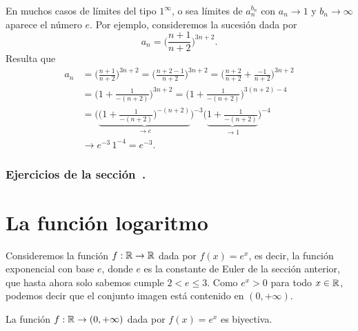 En muchos casos de límites del tipo $1^\infty$, o sea límites de $a_n^{b_n}$ con $a_n \to 1$ y $b_n \to \infty$ aparece el número $e$.
Por ejemplo, consideremos la sucesión dada por 
\[
a_n = \Big(\frac{n+1}{n+2}\Big)^{3n+2}.
\]
Resulta que
\begin{align*}
    a_n &= \Big(\frac{n+1}{n+2}\Big)^{3n+2}
    = \Big(\frac{n+2-1}{n+2}\Big)^{3n+2}
    = \Big(\frac{n+2}{n+2}+\frac{-1}{n+2}\Big)^{3n+2}
    \\
    &= \Big(1+\frac{1}{-(n+2)}\Big)^{3n+2}
    = \Big(1+\frac{1}{-(n+2)}\Big)^{3(n+2)-4}
    \\
    &= \Bigg(\underbrace{\Big(1+\frac{1}{-(n+2)}\Big)^{-(n+2)}}_{\to e}\Bigg)^{-3}
     \Big(\underbrace{1+\frac{1}{-(n+2)}}_{\to 1}\Big)^{-4}
     \\
     &\to e^{-3} \, 1^{-4} = e^{-3}.
\end{align*}

\subsubsection*{Ejercicios de la sección~.}

\begin{enumerate}

\end{enumerate}

\section{La función logaritmo}

Consideremos la función $f:\mathbb{R}\to\mathbb{R}$ dada por $f(x) = e^x$, es decir, la función exponencial con base $e$, donde $e$ es la constante de Euler de la sección anterior, que hasta ahora solo sabemos cumple $2<e\le3$. Como $e^x > 0$ para todo $x\in\mathbb{R}$, podemos decir que el conjunto imagen está contenido en $(0,+\infty)$.

\begin{proposition}\label{P:exp biyectiva}
    La función $f:\mathbb{R} \to (0,+\infty)$ dada por $f(x)=e^x$ es biyectiva.
\end{proposition}

